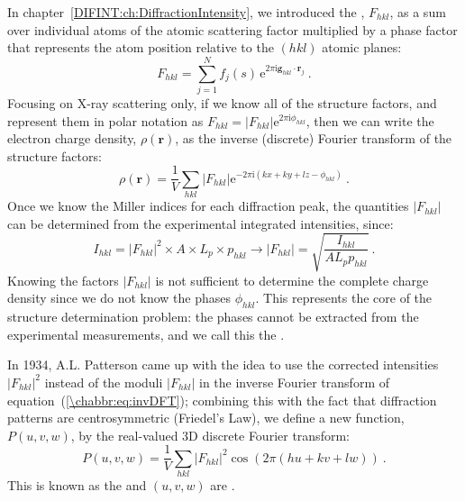 In chapter~\ref{DIFINT:ch:DiffractionIntensity}, we introduced the , $F_{hkl}$, as a sum over individual atoms of the atomic scattering factor multiplied by a phase factor that represents the atom position relative to the $(hkl)$ atomic planes:
\begin{equation}
	F_{hkl} = \sum_{j=1}^{N} f_j(s)\,\mathrm{e}^{2\pi\mathrm{i}\mathbf{g}_{hkl}\cdot\mathbf{r}_j}\ .\label{\chabbr:eq:StructureFactor}
\end{equation}
Focusing on X-ray scattering only, if we know all of the structure factors, and represent them in polar notation as $F_{hkl}=\vert F_{hkl}\vert\mathrm{e}^{2\pi\mathrm{i}\phi_{hkl}}$, then we can write the electron charge density, $\rho(\mathbf{r})$, as the inverse (discrete) Fourier transform of the structure factors:
\begin{equation}
	\rho(\mathbf{r})=\frac{1}{V}\sum_{hkl}\vert F_{hkl}\vert\mathrm{e}^{-2\pi\mathrm{i}(kx+ky+lz-\phi_{hkl})}\ .\label{\chabbr:eq:invDFT}
\end{equation}
Once we know the Miller indices for each diffraction peak, the quantities $\vert F_{hkl}\vert$ can be determined from the experimental integrated intensities, since:
\[
	I_{hkl}=\vert F_{hkl}\vert^2\times A\times L_p\times p_{hkl}\rightarrow \vert F_{hkl}\vert = \sqrt{\frac{I_{hkl}}{AL_pp_{hkl}}}\ .
\]
Knowing the factors $\vert F_{hkl}\vert$ is not sufficient to determine the complete charge density since we do not know the phases $\phi_{hkl}$. This represents the core of the structure determination problem: the phases cannot be extracted from the experimental measurements, and we call this the .  

In 1934, A.L. Patterson came up with the idea to use the corrected intensities $\vert F_{hkl}\vert^2$ instead of the moduli $\vert F_{hkl}\vert$ in the inverse Fourier transform of equation~(\ref{\chabbr:eq:invDFT}); combining this with the fact that diffraction patterns are centrosymmetric (Friedel's Law), we define a new function, $P(u,v,w)$, by the real-valued 3D discrete Fourier transform:
\begin{equation}
	P(u,v,w)=\frac{1}{V}\sum_{hkl}\vert F_{hkl}\vert^2 \cos(2\pi(hu+kv+lw))\ .\label{\chabbr:eq:Patterson}
\end{equation}
This is known as the  and $(u,v,w)$ are .  

